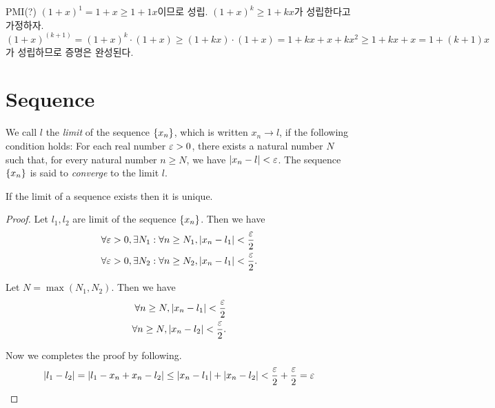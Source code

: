 \begin{solution}
  PMI(?) $(1 + x)^1 = 1 + x \ge 1 + 1x$이므로 성립.
  $(1 + x)^k \ge 1 + kx$가 성립한다고 가정하자.
  $(1 + x)^(k+1) = (1 + x)^k \cdot (1 + x) \ge (1 + kx) \cdot (1 + x)
    = 1 + kx + x + kx^2 \ge 1 + kx + x = 1 + (k + 1)x$가 성립하므로 증명은 완성된다.
\end{solution}

\newpage
\section{Sequence}

\begin{definition}
  \label{def:limit}
  We call $l$ the \emph{limit} of the sequence $\{x_n\}$, which is written
  $x_n \to l$, if the following condition holds: For each real number $\varepsilon > 0$,
  there exists a natural number $N$ such that, for every natural number $n \ge
    N$, we have $\left| x_n - l \right| < \varepsilon$. The sequence $\{x_n\}$ is said to
  \emph{converge} to the limit $l$.
\end{definition}


\begin{theorem}
  \label{thm:limit_unique}
  If the limit of a sequence exists then it is unique.
\end{theorem}

\begin{proof}
  Let $l_1, l_2$ are limit of the sequence $\{x_n\}$. Then we have
  \begin{equation}
    \begin{split}
      &\forall \varepsilon > 0, \exists N_1:
      \forall n \ge N_1, \left| x_n - l_1 \right| < \frac{\varepsilon}{2} \\
      &\forall \varepsilon > 0, \exists N_2:
      \forall n \ge N_2, \left| x_n - l_1 \right| < \frac{\varepsilon}{2}.
    \end{split}
  \end{equation}

  Let $N = \max(N_1, N_2)$. Then we have
  \begin{equation}
    \begin{split}
      \forall n \ge N, \left| x_n - l_1 \right| < \frac{\varepsilon}{2} \\
      \forall n \ge N, \left| x_n - l_2 \right| < \frac{\varepsilon}{2}.
    \end{split}
  \end{equation}

  Now we completes the proof by following.
  \begin{equation}
    \left| l_1 - l_2 \right|
    = \left| l_1 - x_n + x_n - l_2 \right|
    \le \left| x_n - l_1 \right| + \left| x_n - l_2 \right|
    < \frac{\varepsilon}{2} + \frac{\varepsilon}{2} = \varepsilon
  \end{equation}
\end{proof}

